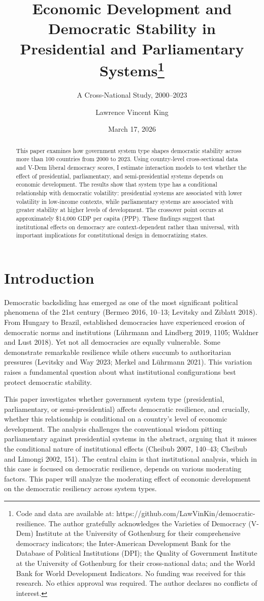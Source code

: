 \documentclass[
  letterpaper,
  DIV=11,
  numbers=noendperiod]{scrartcl}
\title{Economic Development and Democratic Stability in Presidential and
Parliamentary Systems\thanks{Code and data are available at:
https://github.com/LawVinKin/democratic-resilience. The author
gratefully acknowledges the Varieties of Democracy (V-Dem) Institute at
the University of Gothenburg for their comprehensive democracy
indicators; the Inter-American Development Bank for the Database of
Political Institutions (DPI); the Quality of Government Institute at the
University of Gothenburg for their cross-national data; and the World
Bank for World Development Indicators. No funding was received for this
research. No ethics approval was required. The author declares no
conflicts of interest.}}
\subtitle{A Cross-National Study, 2000--2023}
\author{Lawrence Vincent King}
\date{March 17, 2026}
\begin{document}
\maketitle
\begin{abstract}
This paper examines how government system type shapes democratic
stability across more than 100 countries from 2000 to 2023. Using
country-level cross-sectional data and V-Dem liberal democracy scores, I
estimate interaction models to test whether the effect of presidential,
parliamentary, and semi-presidential systems depends on economic
development. The results show that system type has a conditional
relationship with democratic volatility: presidential systems are
associated with lower volatility in low-income contexts, while
parliamentary systems are associated with greater stability at higher
levels of development. The crossover point occurs at approximately
\$14,000 GDP per capita (PPP). These findings suggest that institutional
effects on democracy are context-dependent rather than universal, with
important implications for constitutional design in democratizing
states.
\end{abstract}


\section{Introduction}\label{introduction}

Democratic backsliding has emerged as one of the most significant
political phenomena of the 21st century (Bermeo 2016, 10--13; Levitsky
and Ziblatt 2018). From Hungary to Brazil, established democracies have
experienced erosion of democratic norms and institutions (Lührmann and
Lindberg 2019, 1105; Waldner and Lust 2018). Yet not all democracies are
equally vulnerable. Some demonstrate remarkable resilience while others
succumb to authoritarian pressures (Levitsky and Way 2023; Merkel and
Lührmann 2021). This variation raises a fundamental question about what
institutional configurations best protect democratic stability.

This paper investigates whether government system type (presidential,
parliamentary, or semi-presidential) affects democratic resilience, and
crucially, whether this relationship is conditional on a country's level
of economic development. The analysis challenges the conventional wisdom
pitting parliamentary against presidential systems in the abstract,
arguing that it misses the conditional nature of institutional effects
(Cheibub 2007, 140--43; Cheibub and Limongi 2002, 151). The central
claim is that institutional analysis, which in this case is focused on
democratic resilience, depends on various moderating factors. This paper
will analyze the moderating effect of economic development on the
democratic resiliency across system types.
\end{document}
